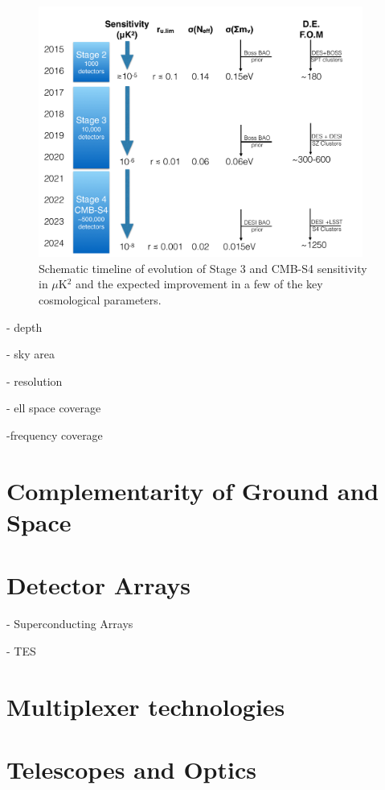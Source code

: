      
    \begin{figure}[ht]
\centering \includegraphics[width=0.95\textwidth]{Intro/Fig-FlowChart1_v1.pdf}
\caption{Schematic timeline of evolution of Stage 3 and CMB-S4 
sensitivity in $\mu$K$^2$ and the expected improvement in a few of the key cosmological parameters.}
\label{fig:science_timeline}
\end{figure} 
     
     - depth
     
     - sky area
     
     - resolution
     
          - ell space coverage
     
     -frequency coverage


\section{Complementarity of Ground and Space}

\section{Detector Arrays}
     
     - Superconducting Arrays
          
     - TES

\section{Multiplexer technologies}

\section{Telescopes and Optics}

